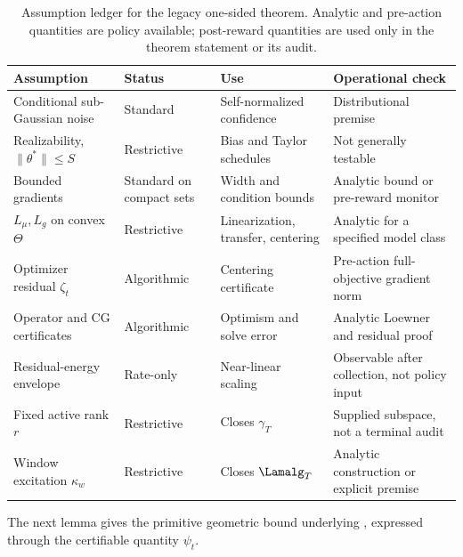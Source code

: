 \begin{table}[h]
\caption{Assumption ledger for the legacy one-sided theorem.  Analytic and
pre-action quantities are policy available; post-reward quantities are used
only in the theorem statement or its audit.}
\label{tab:assumptions}
\centering\ccetablesize
\begin{tabular}{p{}p{}p{}p{}}
\toprule
Assumption & Status & Use & Operational check\\
\midrule
Conditional sub-Gaussian noise & Standard & Self-normalized confidence & Distributional premise\\
Realizability, $\|\theta^*\|\le S$ & Restrictive & Bias and Taylor schedules & Not generally testable\\
Bounded gradients & Standard on compact sets & Width and condition bounds & Analytic bound or pre-reward monitor\\
$L_\mu,L_g$ on convex $\Theta$ & Restrictive & Linearization, transfer, centering & Analytic for a specified model class\\
Optimizer residual $\zeta_t$ & Algorithmic & Centering certificate & Pre-action full-objective gradient norm\\
Operator and CG certificates & Algorithmic & Optimism and solve error & Analytic Loewner and residual proof\\
Residual-energy envelope & Rate-only & Near-linear scaling & Observable after collection, not policy input\\
Fixed active rank $r$ & Restrictive & Closes $\gamma_T$ & Supplied subspace, not a terminal audit\\
Window excitation $\kappa_w$ & Restrictive & Closes $\Lamalg_T$ & Analytic construction or explicit premise\\
\bottomrule
\end{tabular}

\end{table}

The next lemma gives the primitive geometric bound underlying
, expressed through the certifiable quantity $\psi_t$.

